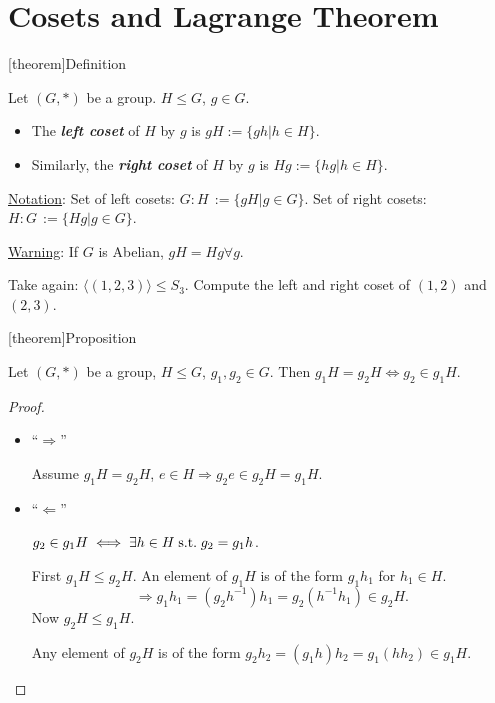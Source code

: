 \documentclass[12pt]{report}
\theoremstyle{definition}
\begin{document}
\section{Cosets and Lagrange Theorem}

[theorem]{Definition}
\begin{cosets}
    Let $(G, *)$ be a group. $H \le G$, $g \in G$.
    \begin{itemize}
            \item The \textbf{\emph{left coset}} of $H$ by $g$ is $gH := \{gh | h \in H\}$.
            \item Similarly, the \textbf{\emph{right coset}} of $H$ by $g$ is $Hg := \{hg | h \in H\}$.
    \end{itemize}
    
\end{cosets}

\underline{Notation}: Set of left cosets: $G:H \,:= \{gH | g \in G\}$.
Set of right cosets: $H:G \,:= \{Hg | g \in G\}$.

\underline{Warning}: If $G$ is Abelian, $gH = Hg \forall g$.

\begin{ex}
    Take again: $\langle (1, 2, 3)\rangle \le S_3$.
    Compute the left and right coset of $(1, 2)$ and $(2, 3)$.
\end{ex}

[theorem]{Proposition}
\begin{coset property}
    Let $(G, *)$ be a group, $H \le G$, $g_1, g_2 \in G$.
    Then $g_1 H = g_2 H \iff g_2 \in g_1 H$.
\end{coset property}

\begin{proof}
   \;

    \begin{itemize}
            \item ``$\Rightarrow{}$''

                Assume $g_1 H = g_2 H$, $e \in H \Rightarrow{} g_2 e \in g_2 H = g_1 H$.
                
            \item ``$\Leftarrow$''

                $g_2 \in g_1 H \iff \exists h \in H \;\textnormal{s.t.}\; g_2 = g_1 h$.

                First $g_1 H \le g_2 H$.
                An element of $g_1 H$ is of the form $g_1 h_1$ for $h_1 \in H$.
                \[
                    \Rightarrow{} g_1 h_1 = (g_2 h^{-1}) h_1 = g_2 (h^{-1} h_1) \in g_2 H.
                \]
                Now $g_2 H \le g_1 H$.

                Any element of $g_2 H$ is of the form $g_2 h_2
                = (g_1 h) h_2 = g_1 (h h_2) \in g_1 H$.
    \end{itemize}
\end{proof}
\end{document}
